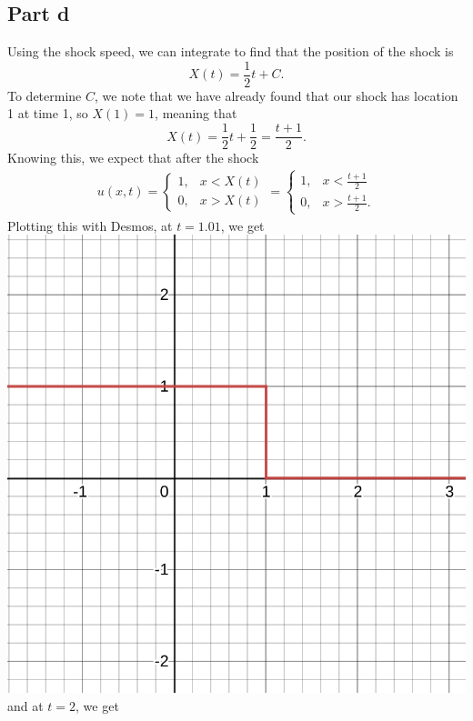 \documentclass{article}
\begin{document}
\subsection{Part d}
Using the shock speed, we can integrate to find that the position of the shock is $$X(t)=\frac{1}{2}t+C.$$
To determine $C$, we note that we have already found that our shock has location 1 at time 1, so $X(1)=1$, meaning that
\[
X(t)=\frac{1}{2}t+\frac{1}{2}=\frac{t+1}{2}.
\]
Knowing this, we expect that after the shock
\begin{align*}
u(x,t)=\begin{cases}
	1, &x<X(t)\\
	0, &x>X(t)
\end{cases}=\begin{cases}
1, &x<\frac{t+1}{2}\\
0, &x>\frac{t+1}{2}.
\end{cases}
\end{align*}
Plotting this with Desmos, at $t=1.01$, we get\\
\includegraphics[scale=0.4]{graph4.png}\\
and at $t=2$, we get\\
\end{document}
